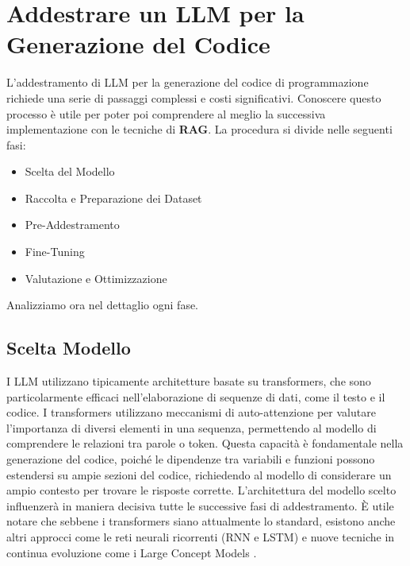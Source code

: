 \documentclass[12pt,a4paper,openright,twoside]{book}
\begin{document}
\chapter{Addestrare un LLM per la Generazione del Codice}
L'addestramento di LLM per la generazione del codice di programmazione richiede una serie di passaggi complessi e costi significativi.
Conoscere questo processo è utile per poter poi comprendere al meglio la successiva implementazione con le tecniche di \textbf{RAG}.
La procedura si divide nelle seguenti fasi:
\begin{itemize}
    \item Scelta del Modello
    \item Raccolta e Preparazione dei Dataset
    \item Pre-Addestramento
    \item Fine-Tuning
    \item Valutazione e Ottimizzazione
\end{itemize}
Analizziamo ora nel dettaglio ogni fase.
\section{Scelta Modello}
I LLM utilizzano tipicamente architetture basate su transformers, che sono particolarmente efficaci nell'elaborazione di sequenze di dati, come il testo e il codice.
I transformers utilizzano meccanismi di auto-attenzione per valutare l'importanza di diversi elementi in una sequenza,
permettendo al modello di comprendere le relazioni tra parole o token.
Questa capacità è fondamentale nella generazione del codice, poiché le dipendenze tra variabili e funzioni possono estendersi su ampie sezioni del codice, richiedendo al modello di considerare un ampio contesto per trovare le risposte corrette.
L'architettura del modello scelto influenzerà in maniera decisiva tutte le successive fasi di addestramento.
È utile notare che sebbene i transformers siano attualmente lo standard, esistono anche altri approcci come le reti neurali ricorrenti (RNN e LSTM) e nuove tecniche in continua evoluzione come i Large Concept Models \cite{code-llm-survey-2024}.
\end{document}
